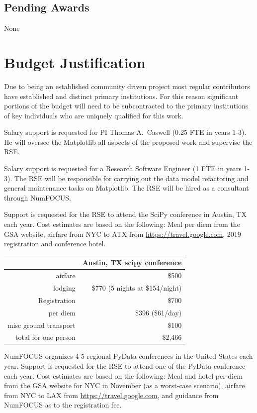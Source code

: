 \documentclass[12pt]{article}
\numberwithin{page}{section}
\begin{document}
\subsection{Pending Awards}
None

\newpage
\section{Budget Justification}
\setcounter{page}{1}

Due to being an established community driven project most regular
contributors have established and distinct primary institutions.  For
this reason significant portions of the budget will need to be
subcontracted to the primary institutions of key individuals who are
uniquely qualified for this work.

Salary support is requested for PI Thomas A.\ Caswell (0.25 FTE in years
1-3).  He will oversee the Matplotlib all aspects of the proposed work
and supervise the RSE.

Salary support is requested for a Research Software Engineer (1 FTE in
years 1-3).  The RSE will be responsible for carrying out the data
model refactoring and general maintenance tasks on Matplotlib.  The
RSE will be hired as a consultant through NumFOCUS.

Support is requested for the RSE to attend the SciPy conference in
Austin, TX each year.  Cost estimates are based on the following: Meal
per diem from the GSA website, airfare from NYC to ATX from
\url{https://travel.google.com}, 2019 registration and conference hotel.

\begin{tabular}{|r|r|}
  \hline
  & Austin, TX scipy conference\\\hline
  airfare & \$500 \\\hline
  lodging & \$770 (5 nights at \$154/night) \\\hline
  Registration & \$700 \\\hline
  per diem & \$396 (\$61/day) \\\hline
  misc ground transport & \$100 \\\hline\hline
  total for one person & \$2,466    \\\hline
\end{tabular}


NumFOCUS organizes 4-5 regional PyData conferences in the United
States each year.  Support is requested for the RSE to attend one of
the PyData conference each year.  Cost estimates are based on the
following: Meal and hotel per diem from the GSA website for NYC in
November (as a worst-case scenario), airfare from NYC to LAX from
\url{https://travel.google.com}, and guidance from NumFOCUS as to the
registration fee.
\end{document}
